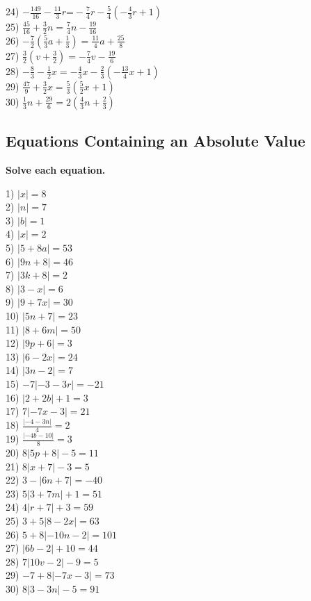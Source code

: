 \documentclass[12pt]{book}
\theoremstyle{definition}
\begin{document}
\begin{multicols}{2}
  24) $- \frac{149}{16} - \frac{11}{3} r \text{=} - \frac{7}{4} r -  \frac{5}{4} (- \frac{4}{3} r + 1)$\\
  25) $\frac{45}{16} + \frac{3}{2} n = \frac{7}{4} n - \frac{19}{16}$\\
  26) $- \frac{7}{2} (\frac{5}{3} a + \frac{1}{3}) = \frac{11}{4} a +\frac{25}{8}$\\
  27) $\frac{3}{2} (v + \frac{3}{2}) = - \frac{7}{4} v - \frac{19}{6}$\\
  28) $- \frac{8}{3} - \frac{1}{2} x = - \frac{4}{3} x - \frac{2}{3} (-\frac{13}{4} x + 1)$\\
  29) $\frac{47}{9} + \frac{3}{2} x = \frac{5}{3} (\frac{5}{2} x_{} + 1)$\\
  30) $\frac{1}{3} n + \frac{29}{6} = 2 (\frac{4}{3} n + \frac{2}{3})$ 
\end{multicols}
\subsection*{Equations Containing an Absolute Value}
{\bf Solve each equation.}
\begin{multicols}{3}
  1) $| x| = 8$\\
  2) $| n | = 7$\\
  3) $| b| = 1$\\
  4) $| x | = 2$\\
  5) $| 5 + 8 a| = 53$\\
  6) $|9n + 8| = 46$\\
  7) $|3k + 8| = 2$\\
  8) $|3 - x| = 6$\\
  9) $|9 + 7 x| = 30$\\
  10) $|5n + 7| = 23$\\
  11) $|8 + 6 m| = 50$\\
  12) $|9p + 6| = 3$\\
  13) $|6 - 2 x| = 24$\\
  14) $|3n - 2| = 7$\\
  15) $- 7| - 3 - 3 r| = - 21$\\
  16) $| 2 + 2 b| + 1 = 3$\\
  17) $7 | - 7 x - 3| = 21$\\
  18) $\frac{| - 4 - 3 n|}{4} = 2$\\
  19) $\frac{| - 4 b - 10|}{8} = 3$\\
  20) $8 |5p + 8| - 5 = 11$\\
  21) $8 | x + 7 | - 3 = 5$\\
  22) $3 - |6n + 7| = - 40$\\
  23) $5 |3 + 7 m| + 1 = 51$\\
  24) $4 |r + 7| + 3 = 59$\\
  25) $3 + 5 |8 - 2 x| = 63$\\
  26) $5 + 8| - 10 n - 2| = 101$\\
  27) $|6b - 2| + 10 = 44$\\
  28) $7 |10v - 2| - 9 = 5$\\
  29) $- 7 + 8| - 7 x - 3| = 73$\\
  30) $8 |3 - 3 n| - 5 = 91$
\end{multicols}
\end{document}
